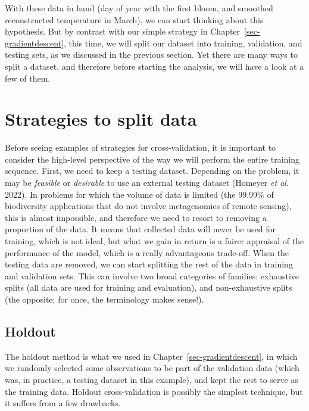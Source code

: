 \documentclass[
  letterpaper,
]{scrbook}
\begin{document}
With these data in hand (day of year with the first bloom, and smoothed
reconstructed temperature in March), we can start thinking about this
hypothesis. But by contrast with our simple strategy in
Chapter~\ref{sec-gradientdescent}, this time, we will split our dataset
into training, validation, and testing sets, as we discussed in the
previous section. Yet there are many ways to split a dataset, and
therefore before starting the analysis, we will have a look at a few of
them.

\section{Strategies to split data}\label{strategies-to-split-data}

Before seeing examples of strategies for cross-validation, it is
important to consider the high-level perspective of the way we will
perform the entire training sequence. First, we need to keep a testing
dataset. Depending on the problem, it may be \emph{feasible} or
\emph{desirable} to use an external testing dataset (Homeyer \emph{et
al.} 2022). In problems for which the volume of data is limited (the
99.99\% of biodiversity applications that do not involve metagenomics of
remote sensing), this is almost impossible, and therefore we need to
resort to removing a proportion of the data. It means that collected
data will never be used for training, which is not ideal, but what we
gain in return is a fairer appraisal of the performance of the model,
which is a really advantageous trade-off. When the testing data are
removed, we can start splitting the rest of the data in training and
validation sets. This can involve two broad categories of families:
exhaustive splits (all data are used for training and evaluation), and
non-exhaustive splits (the opposite; for once, the terminology makes
sense!).

\subsection{Holdout}\label{sec-crossvalidation-holdout}

The holdout method is what we used in Chapter~\ref{sec-gradientdescent},
in which we randomly selected some observations to be part of the
validation data (which was, in practice, a testing dataset in this
example), and kept the rest to serve as the training data. Holdout
cross-validation is possibly the simplest technique, but it suffers from
a few drawbacks.
\end{document}
